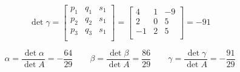 $$
\det{\gamma} = \begin{bmatrix}
  p_1 & q_1 & s_1 \\
  p_2 & q_2 & s_1 \\
  p_3 & q_3 & s_1 \\
\end{bmatrix} = \begin{bmatrix}
   4 & 1 & -9 \\
   2 & 0 & 5  \\
  -1 & 2 & 5  \\
\end{bmatrix} = -91
$$

$$
\boxed{
  \alpha = \dfrac{\det{\alpha}}{\det{A}} = -\dfrac{64}{29} \qquad \beta = \dfrac{\det{\beta}}{\det{A}} = \dfrac{86}{29} \qquad \gamma = \dfrac{\det{\gamma}}{\det{A}} = -\dfrac{91}{29}
}
$$
